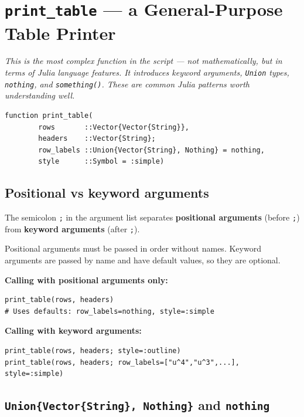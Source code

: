 \documentclass[12pt, a4paper]{article}
\newcommand{\cd}[1]{\texttt{#1}}
\begin{document}
\section{\texttt{print\_table} --- a General-Purpose Table Printer}

\textit{This is the most complex function in the script ---
not mathematically, but in terms of Julia language features.
It introduces keyword arguments, \cd{Union} types,
\cd{nothing}, and \cd{something()}.
These are common Julia patterns worth understanding well.}

\begin{verbatim}
function print_table(
        rows       ::Vector{Vector{String}},
        headers    ::Vector{String};
        row_labels ::Union{Vector{String}, Nothing} = nothing,
        style      ::Symbol = :simple)
\end{verbatim}

\subsection{Positional vs keyword arguments}

The semicolon \cd{;} in the argument list separates
\textbf{positional arguments} (before \cd{;}) from
\textbf{keyword arguments} (after \cd{;}).

Positional arguments must be passed in order without names.
Keyword arguments are passed by name and have default values,
so they are optional.

\begin{examplebox}
\textbf{Calling with positional arguments only:}
\begin{verbatim}
print_table(rows, headers)
# Uses defaults: row_labels=nothing, style=:simple
\end{verbatim}

\textbf{Calling with keyword arguments:}
\begin{verbatim}
print_table(rows, headers; style=:outline)
print_table(rows, headers; row_labels=["u^4","u^3",...], style=:simple)
\end{verbatim}
\end{examplebox}

\subsection{\texttt{Union\{Vector\{String\}, Nothing\}} and \texttt{nothing}}
\end{document}

